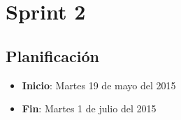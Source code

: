\documentclass[a4paper,12pt]{article}
\begin{document}
\section{Sprint 2} %
\subsection{Planificación}

\begin{itemize}
    \item \textbf{Inicio}: Martes 19 de mayo del 2015
    \item \textbf{Fin}: Martes 1 de julio del 2015 
\end{itemize}
\end{document}
